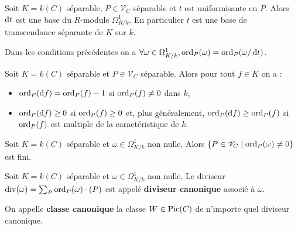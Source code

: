 	\begin{pop}
		Soit $K = k(C)$ séparable, $P \in \mathscr{V}_C$ séparable et $t$ est uniformisante en $P$.
		Alors $\mathop{}\mathopen{}\mathrm{d} t$ est une base du $R$-module $\Omega^1_{R/k}$.
		En particulier $t$ est une base de transcendance séparante de $K$ sur $k$.
	\end{pop}
	
	\begin{cor}
		Dans les conditions précédentes on a $\forall \omega \in \Omega^1_{K/k}, \operatorname{ord}_P(\omega) = \operatorname{ord}_P(\omega / \mathop{}\mathopen{}\mathrm{d} t)$.
	\end{cor}
	
	\begin{pop}
		Soit $K = k(C)$ séparable et $P \in \mathscr{V}_C$ séparable.
		Alors pour tout $f \in K$ on a :
		\begin{itemize}
			\item[\textbullet] $\operatorname{ord}_P(\mathop{}\mathopen{}\mathrm{d} f) = \operatorname{ord}_P(f) - 1$ si $\operatorname{ord}_P(f) \neq 0$ dans $k$,
			\item[\textbullet] $\operatorname{ord}_P(\mathop{}\mathopen{}\mathrm{d} f) \geq 0$ si $\operatorname{ord}_P(f) \geq 0$ et, plus généralement, $\operatorname{ord}_P(\mathop{}\mathopen{}\mathrm{d} f) \geq \operatorname{ord}_P(f)$ si $\operatorname{ord}_P(f)$ est multiple de la caractéristique de $k$.
		\end{itemize}
	\end{pop}
	
	\begin{pop}
		Soit $K = k(C)$ séparable et $\omega \in \Omega^1_{K/k}$ non nulle.
		Alors $\{ P \in \mathscr{V}_C \mid \operatorname{ord}_P(\omega) \neq 0 \}$ est fini.
	\end{pop}
	
	\begin{defn}
		Soit $K = k(C)$ séparable et $\omega \in \Omega^1_{K/k}$ non nulle.
		Le diviseur $\operatorname{div}(\omega) = \sum_P \operatorname{ord}_P(\omega) \cdot (P)$ est appelé \textbf{diviseur canonique} associé à $\omega$.
	\end{defn}

	On appelle \textbf{classe canonique} la classe $W \in \operatorname{Pic}(C)$ de n'importe quel diviseur canonique.


	



	



	